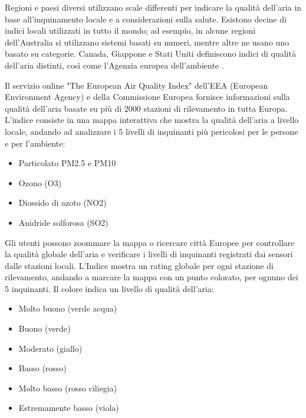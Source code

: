 Regioni e paesi diversi utilizzano scale differenti per indicare la qualità dell'aria in base all'inquinamento locale e
a considerazioni sulla salute. Esistono decine di indici locali utilizzati in tutto il mondo;
ad esempio, in alcune regioni dell'Australia si utilizzano sistemi basati su numeri, mentre altre ne usano uno basato
su categorie. Canada, Giappone e Stati Uniti definiscono indici di qualità dell'aria distinti, così come
l'Agenzia europea dell'ambiente \cite{EuropeanEnvironmentAgency}.

Il servizio online "The European Air Quality Index" dell'EEA  (European Environment Agency) e
della Commissione Europea fornisce informazioni sulla qualità dell'aria basate su più di 2000 stazioni di rilevamento
in tutta Europa. L'indice consiste in una mappa interattiva che mostra la qualità dell'aria a livello locale,
andando ad analizzare i 5 livelli di inquinanti più pericolosi per le persone e per l'ambiente:

\begin{itemize}
  \item Particolato PM2.5 e PM10
  \item Ozono (O3)
  \item Diossido di azoto (NO2)
  \item Anidride solforosa (SO2)
\end{itemize}

Gli utenti possono zoommare la mappa o ricercare città Europee per controllare la qualità globale dell'aria e verificare i livelli di inquinanti registrati dai sensori dalle stazioni locali. L'Indice mostra un rating globale per ogni stazione di rilevamento, andando a marcare la mappa con un punto colorato, per ognuno dei 5 inquinanti. Il colore indica un livello di qualità dell'aria:
\begin{itemize}
  \item Molto buono (verde acqua)
  \item Buono (verde)
  \item Moderato (giallo)
  \item Basso (rosso)
  \item Molto basso (rosso ciliegia)
  \item Estremamente basso (viola)
\end{itemize}

